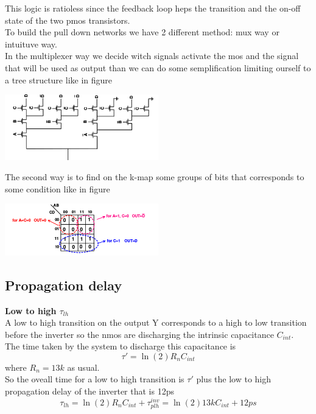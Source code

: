 This logic is ratioless since the feedback loop heps the transition and the on-off state of the two pmos transistors.\\
\vspace{5mm}
To build the pull down networks we have 2 different method: mux way or intuituve way.\\
In the multiplexer way we decide witch signals activate the mos and the signal that will be used as output than we can do some semplification limiting ourself to a tree structure like in figure

\vspace{5mm}
\centering
\includegraphics[width=0.5\textwidth]{C8_5.png}\\
\raggedright
\vspace{5mm}

The second way is to find on the k-map some groups of bits that corresponds to some condition like in figure

\vspace{5mm}
\centering
\includegraphics[width=0.5\textwidth]{C8_6.png}\\
\raggedright
\vspace{5mm}

\subsection{Propagation delay}
{\bf Low to high $\tau_{lh}$}\\
A low to high transition on the output Y corresponds to a high to low transition before the inverter so the nmos are discharging the intrinsic capacitance $C_{int}$.\\
The time taken by the system to discharge this capacitance is 
\begin{equation}
\tau'=\ln(2)R_nC_{int}
\end{equation}
where $R_n=13k$ as usual.\\
So the oveall time for a low to high transition is $\tau'$ plus the low to high propagation delay of the inverter that is 12ps
\begin{equation}
\tau_{lh}=\ln(2)R_nC_{int}+\tau_{plh}^{inv}=\ln(2)13kC_{int}+12ps
\end{equation}

